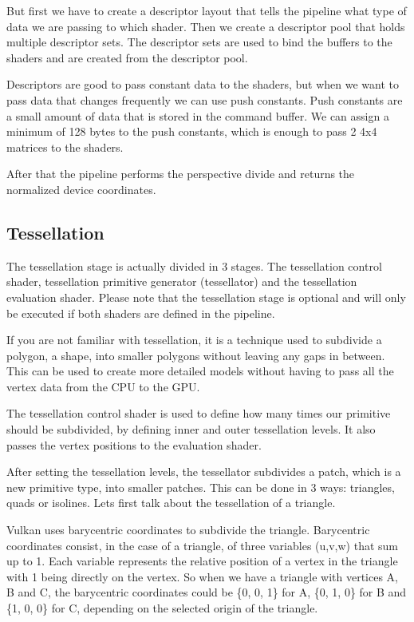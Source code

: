 \documentclass[12pt]{report} \usepackage{preamble}
\begin{document}
But first we have to create a descriptor layout that tells the pipeline
what type of data we are passing to which shader. Then we create a descriptor
pool that holds multiple descriptor sets. The descriptor sets are used to
bind the buffers to the shaders and are created from the descriptor pool. \cite{vulkan-tutorial-descriptors}

Descriptors are good to pass constant data to the shaders, but when we
want to pass data that changes frequently we can use push constants.
Push constants are a small amount of data that is stored in the command
buffer. We can assign a minimum of 128 bytes to the push constants, which
is enough to pass 2 4x4 matrices to the shaders. \cite{push-constants}

After that the pipeline performs the perspective divide and returns the
normalized device coordinates.

\subsection{Tessellation}

The tessellation stage is actually divided in 3 stages. The tessellation
control shader, tessellation primitive generator (tessellator) and the tessellation
evaluation shader. Please note that the tessellation stage is optional and will
only be executed if both shaders are defined in the pipeline.\cite{tessellation}

If you are not familiar with tessellation, it is a technique used to
subdivide a polygon, a shape, into smaller polygons without leaving
any gaps in between. This can be used to create more detailed models
without having to pass all the vertex data from the CPU to the GPU. \cite{tessellation}

The tessellation control shader is used to define how many times
our primitive should be subdivided, by defining inner and outer tessellation levels.
It also passes the vertex positions to the evaluation shader. \cite{tessellation}

After setting the tessellation levels, the tessellator subdivides a patch, which is
a new primitive type, into smaller patches.
This can be done in 3 ways: triangles, quads or isolines.
Lets first talk about the tessellation of a triangle.

Vulkan uses barycentric coordinates to subdivide the triangle. Barycentric
coordinates consist, in the case of a triangle, of three variables (u,v,w) that sum up to 1.
Each variable represents the relative position of a vertex in the triangle with 1 being directly
on the vertex. So when we have a triangle with vertices A, B and C, the barycentric coordinates
could be \{0, 0, 1\} for A, \{0, 1, 0\} for B and \{1, 0, 0\} for C, depending on the selected
origin of the triangle. \cite{tessellation}
\end{document}
